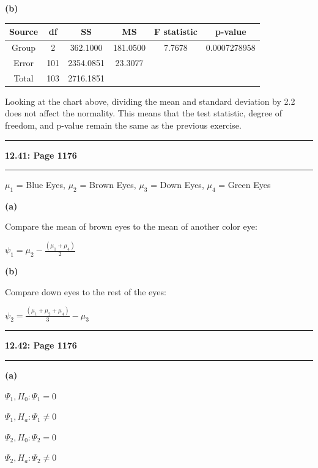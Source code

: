 \documentclass[11pt]{article}
\newcommand\question[2]{\vspace{.25in}\hrule\textbf{#1: #2}\vspace{.5em}\hrule\vspace{.10in}}
\renewcommand\part[1]{\vspace{.10in}\textbf{(#1)}\par}
\begin{document}
	\part{b}
		\begin{tabular}{|c|c|c|c|c|c|}
			\hline
			Source & df & SS & MS & F statistic & p-value\\
			\hline
			Group & 2 & 362.1000 & 181.0500 & 7.7678 & 0.0007278958\\
			\hline
			Error & 101 & 2354.0851 & 23.3077 & &\\
			\hline
			Total & 103 & 2716.1851 &&&\\
			\hline
		\end{tabular}\par

    Looking at the chart above, dividing the mean and standard deviation by 2.2 does not
    affect the normality. This means that the test statistic, degree of freedom, and p-value
    remain the same as the previous exercise. \par


\question{12.41}{Page 1176}
    $\mu_{1}$ = Blue Eyes,
    $\mu_{2}$ = Brown Eyes,
		$\mu_{3}$ = Down Eyes,
		$\mu_{4}$ = Green Eyes\par
	\part{a}
		Compare the mean of brown eyes to the mean of another color eye:\par
		$\psi_{1}=\mu_{2} - \frac{(\mu_{1} + \mu_{4})}{2}$\par
	
	\part{b}
		Compare down eyes to the rest of the eyes:\par
		$\psi_{2} = \frac{(\mu_{1} + \mu_{2} + \mu_{4})}{3}-\mu_{3}$


\question{12.42}{Page 1176}
	\part{a}
		$\Psi_{1}, H_{0}: \Psi_{1} = 0$\par
		$\Psi_{1}, H_{a}: \Psi_{1} \ne 0$\par
		$\Psi_{2}, H_{0}: \Psi_{2} = 0$\par
		$\Psi_{2}, H_{a}: \Psi_{2} \ne 0$\par
	
\end{document}
